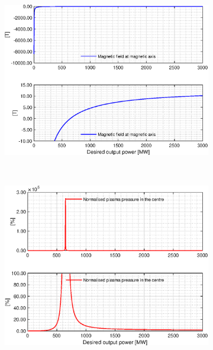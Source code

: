 \begin{figure}[H]
	\begin{subfigure}[b]{.45\textwidth}
		\includegraphics[width=\textwidth]{MatlabFigures/PE/f7.eps}
	\end{subfigure}
	~
	\begin{subfigure}[b]{.45\textwidth}
		\includegraphics[width=\textwidth]{MatlabFigures/PE/f8.eps}
	\end{subfigure}
\end{figure}
